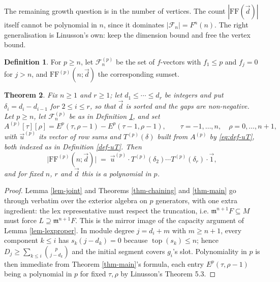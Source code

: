 \documentclass[11pt, a4paper, abstract=yes]{scrartcl}
\theoremstyle{definition}
\newtheorem{definition}{Definition}
\theoremstyle{remark}
\theoremstyle{plain}
\newtheorem{theorem}[definition]{Theorem}
\newcommand{\tp}{\operatorname{top}}
\begin{document}
The remaining growth question is in the number of vertices. The count \(|\mathrm{FF}(\vec d)|\) itself
cannot be polynomial in \(n\), since it dominates \(|\mathcal F_n|=F^n(n)\). The right generalisation
is Linusson's own: keep the dimension bound and free the vertex bound.

\begin{definition}
For \(p\ge n\), let \(\mathcal F_n^{(p)}\) be the set of \(f\)-vectors with \(f_1\le p\) and
\(f_j=0\) for \(j>n\), and \(\mathrm{FF}^{(p)}(n;\vec d)\) the corresponding sumset.
\label{def-twoparam}
\end{definition}

\begin{theorem}
Fix \(n\ge1\) and \(r\ge1\); let \(d_1\le\cdots\le d_r\) be integers and put
\(\delta_i=d_i-d_{i-1}\) for \(2\le i\le r\), so that \(\vec d\) is sorted and the gaps are
non-negative. Let \(p\ge n\), let \(\mathcal F_n^{(p)}\) be as in Definition \ref{def-twoparam}, and set
\begin{equation}\label{eq:Ap}
  A^{(p)}[\tau][\rho]=E^p(\tau,\rho-1)-E^p(\tau-1,\rho-1),
  \qquad \tau=-1,\dots,n,\quad\rho=0,\dots,n+1,
\end{equation}
with \(\vec u^{(p)}\) its vector of row sums and \(T^{(p)}(\delta)\) built from \(A^{(p)}\) by
\eqref{eq:def-uT}, both indexed as in Definition \ref{def-uT}. Then
\begin{equation}\label{eq:auto-20}
  \lvert\mathrm{FF}^{(p)}(n;\vec d)\rvert\;=\;\vec u^{(p)}\cdot T^{(p)}(\delta_2)\cdots T^{(p)}(\delta_r)\cdot\vec 1 ,
\end{equation}
and for fixed \(n\), \(r\) and \(\vec d\) this is a polynomial in \(p\).
\label{thm-poly-p}
\end{theorem}

\begin{proof}
Lemma \ref{lem-joint} and Theorems \ref{thm-chaining} and \ref{thm-main} go through verbatim over the exterior
algebra on \(p\) generators, with one extra ingredient: the lex representative must respect the
truncation, i.e. \(\mathfrak m^{n+1}F\subseteq M\) must force \(L\supseteq\mathfrak m^{n+1}F\). This
is the mirror image of the capacity argument of Lemma \ref{lem-lexproper}. In module degree
\(j=d_i+m\) with \(m\ge n+1\), every component \(k\le i\) has \(s_k(j-d_k)=0\) because
\(\tp(s_k)\le n\); hence \(D_j\ge\sum_{k\le i}\binom p{j-d_k}\) and the initial segment covers
\(g_i\)'s slot. Polynomiality in \(p\) is then immediate from Theorem \ref{thm-main}'s formula, each
entry \(E^p(\tau,\rho-1)\) being a polynomial in \(p\) for fixed \(\tau,\rho\) by Linusson's
Theorem 5.3.
\end{proof}
\end{document}
